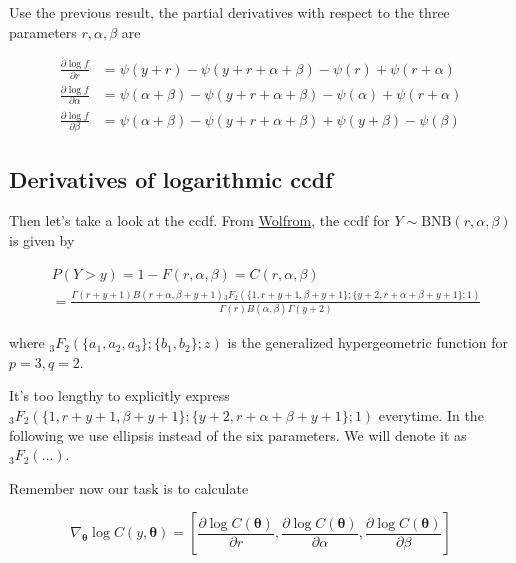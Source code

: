 \documentclass[11pt]{article}
\begin{document}
Use the previous result, the partial derivatives with respect to the three parameters $r, \alpha, \beta$ are

\begin{equation}
  \begin{aligned}
\frac{\partial \log f}{\partial r} &= \psi(y+r) - \psi(y+r+\alpha+\beta) - \psi(r) + \psi(r+\alpha) \\
\frac{\partial \log f}{\partial \alpha} &= \psi(\alpha+\beta) - \psi(y+r+\alpha+\beta) - \psi(\alpha) + \psi(r+\alpha) \\
\frac{\partial \log f}{\partial \beta} &= \psi(\alpha+\beta) - \psi(y+r+\alpha+\beta) + \psi(y+\beta) - \psi(\beta)
  \end{aligned}
\end{equation}


\subsection*{Derivatives of logarithmic ccdf}
Then let's take a look at the ccdf. From \href{https://reference.wolfram.com/language/ref/BetaNegativeBinomialDistribution.html}{Wolfrom}, the ccdf for $Y\sim \text{BNB}(r,\alpha,\beta)$ is given by

\begin{equation}
\begin{aligned}
& P(Y > y) = 1 - F(r,\alpha,\beta) = C(r,\alpha,\beta) \\
&= \frac{\Gamma (r+y +1) B(r+\alpha ,\beta +y +1) {}_3F_2(\{1,r+y +1,\beta +y +1\}; \{y +2,r+\alpha +\beta +y +1\};1)}{\Gamma (r) B(\alpha ,\beta ) \Gamma (y +2)}
\end{aligned}
\end{equation}

where $_3F_2(\{a_1,a_2,a_3\}; \{b_1,b_2\};z)$ is the generalized hypergeometric function \citep[Ch.~16]{olver2010nist} for $p=3,q=2$. 

It's too lengthy to explicitly express ${}_3F_2(\{1,r+y +1,\beta +y +1\}; \{y +2,r+\alpha +\beta +y +1\};1)$ everytime. In the following we use ellipsis instead of the six parameters. We will denote it as $_3F_2(...)$.


Remember now our task is to calculate

\begin{equation}
	\nabla _{\boldsymbol {\theta}}\log C(y,\boldsymbol\theta) = \left[ \frac{\partial \log C(\boldsymbol {\theta})}{\partial r}, \frac{\partial \log C(\boldsymbol {\theta})}{\partial \alpha}, \frac{\partial \log C(\boldsymbol {\theta})}{\partial \beta} \right]
\end{equation}
\end{document}
